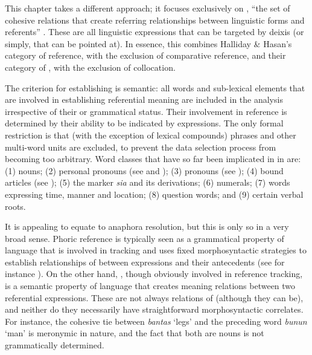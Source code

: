 \documentclass[output=paper
,modfonts
,nonflat]{langsci/langscibook}
\begin{document}
This chapter takes a different approach; it focuses exclusively on , “the set of cohesive relations that create referring relationships between linguistic forms and referents” \citep[107]{DeBusser2017}. These are all linguistic expressions that can be targeted by deixis (or simply, that can be pointed at). In essence, this combines Halliday \& Hasan’s category of reference, with the exclusion of comparative reference, and their category of , with the exclusion of collocation.

The criterion for establishing  is semantic: all words and sub-lex\-i\-cal elements that are involved in establishing referential meaning are included in the  analysis irrespective of their  or grammatical status. Their involvement in reference is determined by their ability to be indicated by  expressions. The only formal restriction is that (with the exception of lexical compounds) phrases and other multi-word units are excluded, to prevent the data selection process from becoming too arbitrary. Word classes that have so far been implicated in  in  are: (1) nouns; (2) personal pronouns (see  and ); (3)  pronouns (see ); (4) bound  articles (see ); (5) the  marker \textit{sia} and its derivations; (6) numerals; (7) words expressing time, manner and location; (8) question words; and (9) certain verbal roots.

It is appealing to equate  to anaphora resolution, but this is only so in a very broad sense. Phoric reference is typically seen as a grammatical property of language that is involved in  tracking and uses fixed morphosyntactic strategies to establish relationships of  between expressions and their antecedents (see for instance \citealt{Huang2000}). On the other hand, , though obviously involved in reference tracking, is a semantic property of language that creates meaning relations between two referential expressions. These are not always relations of  (although they can be), and neither do they necessarily have straightforward morphosyntactic correlates. For instance, the cohesive tie between \textit{bantas} ‘legs’ and the preceding word \textit{bunun} ‘man’ is meronymic in nature, and the fact that both are nouns is not grammatically determined.
\end{document}
